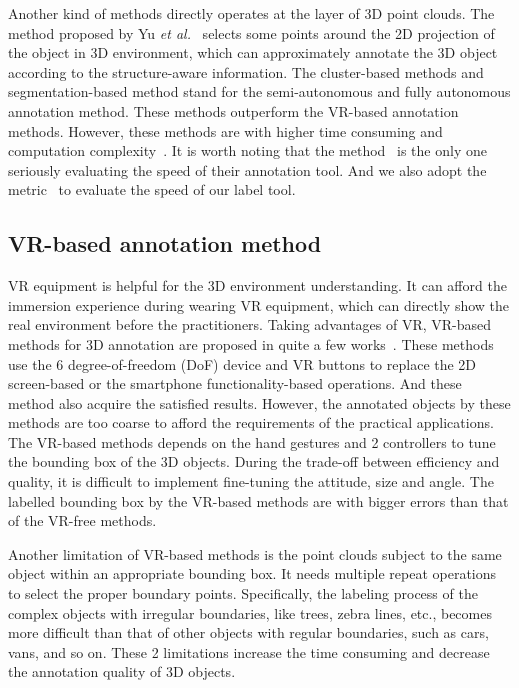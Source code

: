 \documentclass[letterpaper, 10 pt, conference]{ieeeconf}  %
\begin{document}
Another kind of methods directly operates at the layer of 3D point clouds.
The method proposed by Yu \textit{et al.}~\cite{yu2012efficient} selects some points around the 2D projection of the object in 3D environment, which can approximately annotate the 3D object according to the structure-aware information. The cluster-based methods and segmentation-based method stand for the semi-autonomous and fully autonomous annotation method.
These methods outperform the VR-based annotation methods. However, these methods are with higher time consuming and computation complexity~\cite{pointatme}. It is worth noting that the method~\cite{monica2017multi} is the only one seriously evaluating the speed of their annotation tool. And we also adopt the metric~\cite{monica2017multi} to evaluate the speed of our label tool.
\subsection{VR-based annotation method}
VR equipment is helpful for the 3D environment understanding. It can afford the immersion experience during wearing VR equipment, which can directly show the real environment before the practitioners. Taking advantages of VR, VR-based methods for 3D annotation are proposed in quite a few works~\cite{pointatme,wilkes20123dVR,coffey2011interactiveVR}. These methods use the 6 degree-of-freedom (DoF) device and VR buttons to replace the 2D screen-based or the smartphone functionality-based operations. And these method also acquire the satisfied results. However, the annotated objects by these methods are too coarse to afford the requirements of the practical applications. The VR-based methods depends on the hand gestures and 2 controllers to tune the bounding box of the 3D objects. During the trade-off between efficiency and quality, it is difficult to implement fine-tuning the attitude, size and angle.  The labelled bounding box by the VR-based methods are with bigger errors than that of the VR-free methods.

Another limitation of VR-based methods is the point clouds subject to the same object within an appropriate bounding box.
It needs multiple repeat operations to select the proper boundary points.
Specifically, the labeling process of the complex objects with irregular boundaries, like trees, zebra lines, etc., becomes more difficult than that of other objects with regular boundaries, such as cars, vans, and so on.
These 2 limitations increase the time consuming and decrease the annotation quality of 3D objects.
\end{document}
